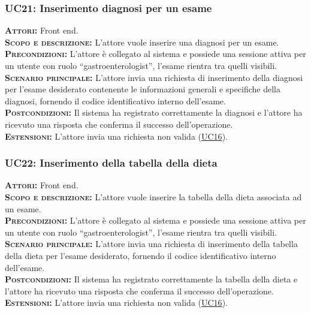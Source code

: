 \subsubsection{UC21: Inserimento diagnosi per un esame}
\label{sec:UC21}
\textsc{\textbf{Attori:}} Front end.\\
\textsc{\textbf{Scopo e descrizione:}} L'attore vuole inserire una diagnosi per un esame.\\
\textsc{\textsc{\textbf{Precondizioni:}}} L'attore è collegato al sistema e possiede una sessione attiva per un utente con ruolo ``gastroenterologist'', l'esame rientra tra quelli visibili.\\
\textsc{\textbf{Scenario principale:}}  L'attore invia una richiesta di inserimento della diagnosi per l'esame desiderato contenente le informazioni generali e specifiche della diagnosi, fornendo il codice identificativo interno dell'esame.\\
\textsc{\textbf{Postcondizioni:}} Il sistema ha registrato correttamente la diagnosi e l'attore ha ricevuto una risposta che conferma il successo dell'operazione.\\
\textsc{\textbf{Estensioni:}} L'attore invia una richiesta non valida (\hyperref[sec:UC16]{UC16}).

\subsubsection{UC22: Inserimento della tabella della dieta}
\label{sec:UC22}
\textsc{\textbf{Attori:}} Front end.\\
\textsc{\textbf{Scopo e descrizione:}} L'attore vuole inserire la tabella della dieta associata ad un esame.\\
\textsc{\textsc{\textbf{Precondizioni:}}} L'attore è collegato al sistema e possiede una sessione attiva per un utente con ruolo ``gastroenterologist'', l'esame rientra tra quelli visibili.\\
\textsc{\textbf{Scenario principale:}}  L'attore invia una richiesta di inserimento della tabella della dieta per l'esame desiderato, fornendo il codice identificativo interno dell'esame.\\
\textsc{\textbf{Postcondizioni:}} Il sistema ha registrato correttamente la tabella della dieta e l'attore ha ricevuto una risposta che conferma il successo dell'operazione.\\
\textsc{\textbf{Estensioni:}} L'attore invia una richiesta non valida (\hyperref[sec:UC16]{UC16}).

